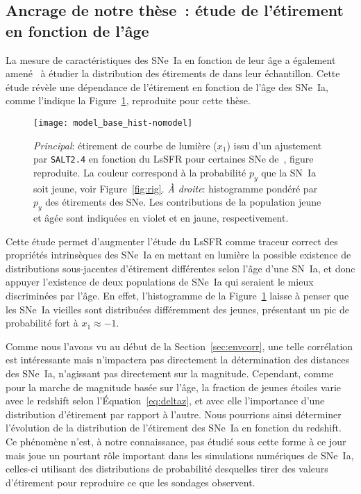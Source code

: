 \documentclass[../main/main.tex]{subfiles}
\begin{document}
\subsection{Ancrage de notre thèse~: étude de l'étirement en fonction de
l'âge}\label{ssec:phdgoal}

La mesure de caractéristiques des SNe~Ia en fonction de leur âge a
également amené~\cite{rigault2020} à étudier la distribution des étirements de
dans leur échantillon. Cette étude révèle une dépendance de l'étirement en
fonction de l'âge des SNe~Ia, comme l'indique la Figure~\ref{fig:x1lssfr},
reproduite pour cette thèse.

\begin{figure}[ht]
    \centering
    \texttt{[image: model\_base\_hist-nomodel]}
    \caption[Dispersion de l'étirement en fonction du LsSFR]{\textit{Principal}:
        étirement de courbe de lumière ($x_1$) issu d'un ajustement par
        \textsc{\texttt{SALT2.4}} en fonction du LsSFR pour certaines SNe
        de~\cite{rigault2020}, figure reproduite. La couleur correspond à la
        probabilité $p_y$ que la SN~Ia soit jeune, voir Figure~\ref{fig:rig}.
        \textit{À droite}: histogramme pondéré par $p_y$ des étirements des SNe.
        Les contributions de la population jeune et âgée sont indiquées en
    violet et en jaune, respectivement.}
    \label{fig:x1lssfr}
\end{figure}

Cette étude permet d'augmenter l'étude du LsSFR comme traceur correct des
propriétés intrinsèques des SNe~Ia en mettant en lumière la possible existence
de distributions sous-jacentes d'étirement différentes selon l'âge d'une SN~Ia,
et donc appuyer l'existence de deux populations de SNe~Ia qui seraient le mieux
discriminées par l'âge. En effet, l'histogramme de la Figure~\ref{fig:x1lssfr}
laisse à penser que les SNe~Ia vieilles sont distribuées différemment des
jeunes, présentant un pic de probabilité fort à $x_1 \approx -1$.

Comme nous l'avons vu au début de la Section~\ref{sec:envcorr}, une telle
corrélation est intéressante mais n'impactera pas directement la détermination
des distances des SNe~Ia, n'agissant pas directement sur la magnitude.
Cependant, comme pour la marche de magnitude basée sur l'âge, la fraction de
jeunes étoiles varie avec le redshift selon l'Équation~\ref{eq:deltaz}, et avec
elle l'importance d'une distribution d'étirement par rapport à l'autre. Nous
pourrions ainsi déterminer l'évolution de la distribution de l'étirement des
SNe~Ia en fonction du redshift. Ce phénomène n'est, à notre connaissance, pas
étudié sous cette forme à ce jour mais joue un pourtant rôle important dans les
simulations numériques de SNe~Ia, celles-ci utilisant des distributions de
probabilité desquelles tirer des valeurs d'étirement pour reproduire ce que les
sondages observent.
\end{document}

